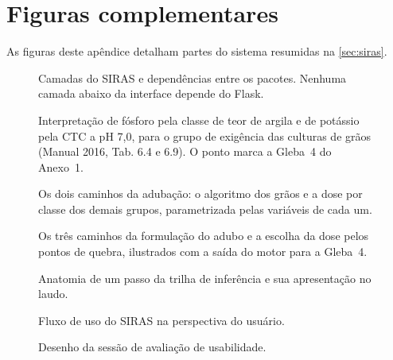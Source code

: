 \appendix
\section{Figuras complementares}\label{sec:apendice_figuras}

As figuras deste apêndice detalham partes do sistema resumidas na \autoref{sec:siras}.

\begin{figure}[!htbp]
\centering
{}
\caption{Camadas do SIRAS e dependências entre os pacotes. Nenhuma camada abaixo da interface
depende do Flask.}
\label{fig:arquitetura}
\end{figure}

\begin{figure}[!tbp]
\centering
{}
\caption{Interpretação de fósforo pela classe de teor de argila e de potássio pela CTC a pH
7,0, para o grupo de exigência das culturas de grãos (Manual 2016, Tab. 6.4 e 6.9). O ponto
marca a Gleba~4 do Anexo~1.}
\label{fig:interpretacao}
\end{figure}

\begin{figure}[!tbp]
\centering
{}
\caption{Os dois caminhos da adubação: o algoritmo dos grãos e a dose por classe dos demais
grupos, parametrizada pelas variáveis de cada um.}
\label{fig:adubacao}
\end{figure}

\begin{figure}[!tbp]
\centering
{}
\caption{Os três caminhos da formulação do adubo e a escolha da dose pelos pontos de quebra,
ilustrados com a saída do motor para a Gleba~4.}
\label{fig:formulacao}
\end{figure}

\begin{figure}[!htbp]
\centering
{}
\caption{Anatomia de um passo da trilha de inferência e sua apresentação no laudo.}
\label{fig:trilha}
\end{figure}

\begin{figure}[!tbp]
\centering
{}
\caption{Fluxo de uso do SIRAS na perspectiva do usuário.}
\label{fig:fluxo}
\end{figure}

\begin{figure}[!htbp]
\centering
{}
\caption{Desenho da sessão de avaliação de usabilidade.}
\label{fig:sessao}
\end{figure}
